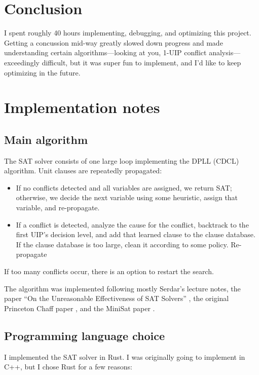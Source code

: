 \documentclass[11pt]{article}
\begin{document}
\section{Conclusion}

I spent roughly 40 hours implementing, debugging, and optimizing this project. Getting a concussion
mid-way greatly slowed down progress and made understanding certain algorithms---looking at you,
1-UIP conflict analysis---exceedingly difficult, but it was super fun to implement, and I'd like to
keep optimizing in the future.

\pagebreak

\appendix

\section{Implementation notes}

\subsection{Main algorithm}\label{app:algo}
The SAT solver consists of one large loop implementing the DPLL (CDCL) algorithm. Unit clauses are
repeatedly propagated: 
\begin{itemize}
    \item If no conflicts detected and all variables are assigned, we return SAT; otherwise, we
        decide the next variable using some heuristic, assign that variable, and re-propagate.
    \item If a conflict is detected, analyze the cause for the conflict, backtrack to the first
        UIP's decision level, and add that learned clause to the clause database. If the clause
        database is too large, clean it according to some policy. Re-propagate
\end{itemize}
If too many conflicts occur, there is an option to restart the search.

The algorithm was implemented following mostly Serdar's lecture notes, the paper ``On the
Unreasonable Effectiveness of SAT Solvers'' \cite{GaneshVardi}, the original Princeton Chaff paper
\cite{Chaff}, and the MiniSat paper \cite{Een}.

\subsection{Programming language choice}\label{app:pl}

I implemented the SAT solver in Rust. I was originally going to implement in C++, but I chose Rust
for a few reasons:
\end{document}
